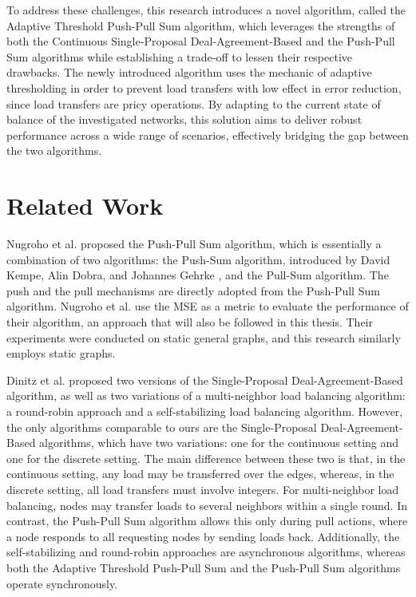 To address these challenges, this research introduces a novel algorithm, called the Adaptive Threshold Push-Pull Sum algorithm, which leverages the strengths of both the Continuous Single-Proposal Deal-Agreement-Based and the Push-Pull Sum algorithms while establishing a trade-off to lessen their respective drawbacks. The newly introduced algorithm uses the mechanic of adaptive thresholding in order to prevent load transfers with low effect in error reduction, since load transfers are pricy operations. By adapting to the current state of balance of the investigated networks, this solution aims to deliver robust performance across a wide range of scenarios, effectively bridging the gap between the two algorithms.

\section{Related Work}\label{sec:relatedwork}
Nugroho et al. \cite{nugroho2023PushPullSumDataAg} proposed the Push-Pull Sum algorithm, which is essentially a combination of two algorithms: the Push-Sum algorithm, introduced by David Kempe, Alin Dobra, and Johannes Gehrke \cite{kempe2003gossipbasedComp}, and the Pull-Sum algorithm. The push and the pull mechanisms are directly adopted from the Push-Pull Sum algorithm. Nugroho et al. use the MSE as a metric to evaluate the performance of their algorithm, an approach that will also be followed in this thesis. Their experiments were conducted on static general graphs, and this research similarly employs static graphs.

Dinitz et al. \cite{Dinitz2023DAB} proposed two versions of the Single-Proposal Deal-Agreement-Based algorithm, as well as two variations of a multi-neighbor load balancing algorithm: a round-robin approach and a self-stabilizing load balancing algorithm. However, the only algorithms comparable to ours are the Single-Proposal Deal-Agreement-Based algorithms, which have two variations: one for the continuous setting and one for the discrete setting. The main difference between these two is that, in the continuous setting, any load may be transferred over the edges, whereas, in the discrete setting, all load transfers must involve integers. For multi-neighbor load balancing, nodes may transfer loads to several neighbors within a single round. In contrast, the Push-Pull Sum algorithm allows this only during pull actions, where a node responds to all requesting nodes by sending loads back. Additionally, the self-stabilizing and round-robin approaches are asynchronous algorithms, whereas both the Adaptive Threshold Push-Pull Sum and the Push-Pull Sum algorithms operate synchronously.

